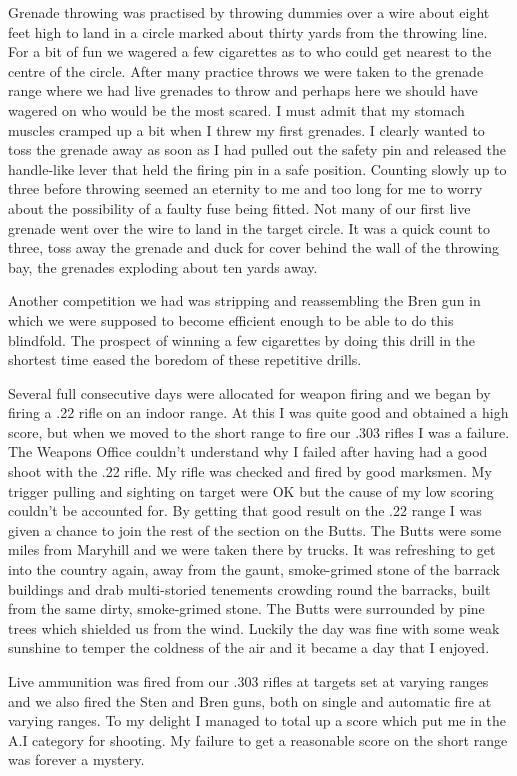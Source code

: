 Grenade throwing was practised by throwing dummies over a wire about
eight feet high to land in a circle marked about thirty yards from the
throwing line. For a bit of fun we wagered a few cigarettes as to who
could get nearest to the centre of the circle. After many practice
throws we were taken to the grenade range where we had live grenades
to throw and perhaps here we should have wagered on who would be the
most scared. I must admit that my stomach muscles cramped up a bit
when I threw my first grenades. I clearly wanted to toss the grenade
away as soon as I had pulled out the safety pin and released the
handle-like lever that held the firing pin in a safe position.
Counting slowly up to three before throwing seemed an eternity to me
and too long for me to worry about the possibility of a faulty fuse
being fitted. Not many of our first live grenade went over the wire
to land in the target circle. It was a quick count to three, toss
away the grenade and duck for cover behind the wall of the throwing
bay, the grenades exploding about ten yards away.

Another competition we had was stripping and reassembling the Bren gun
in which we were supposed to become efficient enough to be able to do
this blindfold. The prospect of winning a few cigarettes by doing
this drill in the shortest time eased the boredom of these repetitive
drills.

Several full consecutive days were allocated for weapon firing and we
began by firing a .22 rifle on an indoor range. At this I was quite
good and obtained a high score, but when we moved to the short range
to fire our .303 rifles I was a failure. The Weapons Office couldn't
understand why I failed after having had a good shoot with the .22
rifle. My rifle was checked and fired by good marksmen. My trigger
pulling and sighting on target were OK but the cause of my low scoring
couldn't be accounted for. By getting that good result on the .22
range I was given a chance to join the rest of the section on the
Butts. The Butts were some miles from Maryhill and we were taken
there by trucks. It was refreshing to get into the country again,
away from the gaunt, smoke-grimed stone of the barrack buildings and
drab multi-storied tenements crowding round the barracks, built from
the same dirty, smoke-grimed stone. The Butts were surrounded by pine
trees which shielded us from the wind. Luckily the day was fine with
some weak sunshine to temper the coldness of the air and it became a
day that I enjoyed.

Live ammunition was fired from our .303 rifles at targets set at
varying ranges and we also fired the Sten and Bren guns, both on
single and automatic fire at varying ranges. To my delight I managed
to total up a score which put me in the A.I category for shooting. My
failure to get a reasonable score on the short range was forever a
mystery.

